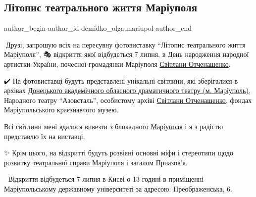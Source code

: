  
 
 
 
 

\subsection{Літопис театрального життя Маріуполя}
\label{sec:29_06_2023.fb.demidko_olga.mariupol.2.litopys_teatralnogo_zhyttja_mariupolja}

\ifcmt
 author_begin
   author_id demidko_olga.mariupol
 author_end
\fi

📎Друзі, запрошую всіх на пересувну фотовиставку \enquote{Літопис театрального життя
Маріуполя}, 🎭 відкриття якої відбудеться 7 липня, в День народження народної
артистки України, почесної громадянки Маріуполя \href{\urlSvitlanaIvanivnaOtchenashenkoIA}{Світлани Отченашенко}.

✔️ На фотовиставці будуть представлені унікальні світлини, які зберігалися в
архівах \href{\urlMariupolDramTeatrIA}{Донецького академічного обласного драматичного театру (м. Маріуполь)},
Народного театру \enquote{Азовсталь}, особистому архіві \href{\urlSvitlanaIvanivnaOtchenashenkoIA}{Світлани Отченашенко}, фондах
Маріупольського краєзнавчого музею.

 Всі світлини мені вдалося вивезти з блокадного \href{\urlMariupolIA}{Маріуполя} і я з радістю
 представлю їх на виставці. 

✨️ Крім цього, на відкритті будуть розвіяні основні міфи і стереотипи щодо
розвитку \href{\temaMariupolTeatrIA}{театральної справи Маріуполя} і загалом Приазов'я.

🏤 Відкриття відбудеться 7 липня в Києві о 13 годині в приміщенні
Маріупольському державному університеті за адресою: Преображенська, 6.
